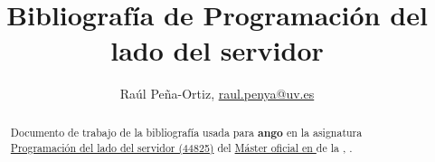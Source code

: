 \documentclass{article}
\title{Bibliografía de Programación del lado del servidor}
\author{Raúl Peña-Ortiz, \href{mailto:raul.penya@uv.es}{raul.penya@uv.es}}
\begin{document}
\def\listtablename{\'Indice de tablas}%
\def\tablename{Tabla}%


\date{}

\maketitle

\vspace{0.5cm}

\noindent\hrulefill
\begin{abstract}
    Documento de trabajo de la bibliografía usada para {\bf{}ango} en la asignatura \href{http://www.uv.es/fatwirepub/Satellite/universitat/es/asignaturas-1286006061961.html?idA=44825&idT=2234;2027}{Programación del lado del servidor (44825)} del \href{https://www.uv.es/twcam}{Máster oficial en } de la \href{http://www.uv.es/etse}{},  \href{http://www.uv.es}{}.
\end{abstract}
\hrulefill

\vspace{1cm}

\tableofcontents


\clearpage

\printbibliography[keyword={T1},title={TEMA 1: Introducción a las aplicaciones web},heading=bibintoc]

\clearpage

\printbibliography[keyword={T2},title={TEMA 2: Aplicaciones web monolíticas en \simpleicon{django}ango},heading=bibintoc]

\clearpage

\printbibliography[keyword={T3},title={TEMA 3: API REST en \simpleicon{django}ango},heading=bibintoc]

\clearpage

\printbibliography[keyword={T4},title={TEMA 4: \simpleicon{django}ango Channels},heading=bibintoc]





\end{document}
